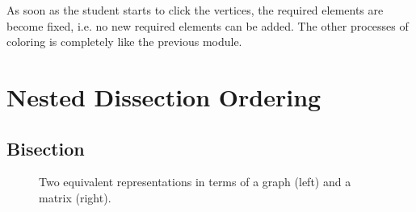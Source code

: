 \documentclass[12pt, oneside]{book}
\begin{document}
As soon as the student starts to click the vertices, the required elements
are become fixed, i.e. no new required  elements can be added.
The other processes of coloring is completely like the previous module.

\section{Nested Dissection Ordering}
\subsection{Bisection}
\cite{2014:02}
\begin{figure}
\centering
{}%
\caption{Two equivalent representations in terms of a graph (left) and a matrix (right).}
\label{initial}
\end{figure}
\end{document}
